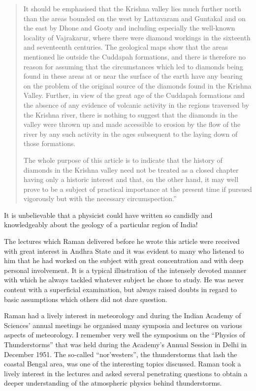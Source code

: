 \begin{quote}
{It should be emphasised that the Krishna valley lies much further north than the areas bounded on the west by Lattavaram and Guntakal and on the east by Dhone and Gooty and including especially the well-known locality of Vajrakarur, where there were diamond workings in the sixteenth and seventeenth centuries. The geological maps show that the areas mentioned lie outside the Cuddapah formations, and there is therefore no reason for assuming that the circumstances which led to diamonds being found in these areas at or near the surface of the earth have any bearing on the problem of the original source of the diamonds found in the Krishna Valley. Further, in view of the great age of the Cuddapah formations and the absence of any evidence of volcanic activity in the regions traversed by the Krishna river, there is nothing to suggest that the diamonds in the valley were thrown up and made accessible to erosion by the flow of the river by any such activity in the ages subsequent to the laying down of those formations.

The whole purpose of this article is to indicate that the history of diamonds in the Krishna valley need not be treated as a closed chapter having only a historic interest and that, on the other hand, it may well prove to be a subject of practical importance at the present time if pursued vigorously but with the necessary circumspection.''}\relax
\end{quote}

It is unbelievable that a physicist could have written so candidly and knowledgeably about the geology of a particular region of India!

The lectures which Raman delivered before he wrote this article were received with great interest in Andhra State and it was evident to many who listened to him that he had worked on the subject with great concentration and with deep personal involvement. It is a typical illustration of the intensely devoted manner with which he always tackled whatever subject he chose to study. He was never content with a superficial examination, but always raised doubts in regard to basic assumptions which others did not dare question.

Raman had a lively interest in meteorology and during the Indian Academy of Sciences' annual meetings he organised many symposia and lectures on various aspects of meteorology. I remember very well the symposium on the ``Physics of Thunderstorms'' that was held during the Academy's Annual Session in Delhi in December 1951. The so-called ``nor'westers'', the thunderstorms that lash the coastal Bengal area, was one of the interesting topics discussed. Raman took a lively interest in the lectures and asked several penetrating questions to obtain a deeper understanding of the atmospheric physics behind thunderstorms.

